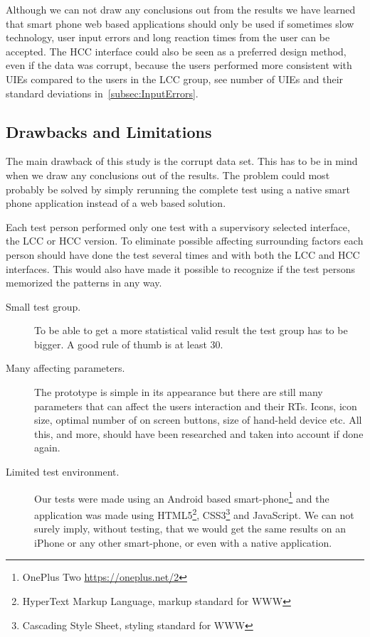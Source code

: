 \documentclass[runningheads,a4paper]{llncs}
\begin{document}
Although we can not draw any conclusions out from the results we have learned that smart phone web based applications should only be used if sometimes slow technology, user input errors and long reaction times from the user can be accepted. The HCC interface could also be seen as a preferred design method, even if the data was corrupt, because the users performed more consistent with UIEs compared to the users in the LCC group, see number of UIEs and their standard deviations in~\ref{subsec:InputErrors}.

\subsection{Drawbacks and Limitations}\label{subsec:drawbacks}
The main drawback of this study is the corrupt data set. This has to be in mind when we draw any conclusions out of the results. The problem could most probably be solved by simply rerunning the complete test using a native smart phone application instead of a web based solution.

Each test person performed only one test with a supervisory selected interface, the LCC or HCC version. To eliminate possible affecting surrounding factors each person should have done the test several times and with both the LCC and HCC interfaces. This would also have made it possible to recognize if the test persons memorized the patterns in any way.

\begin{description}
	\item[Small test group.] To be able to get a more statistical valid result the test group has to be bigger. A good rule of thumb is at least 30.
	\item[Many affecting parameters.] The prototype is simple in its appearance but there are still many parameters that can affect the users interaction and their RTs. Icons, icon size, optimal number of on screen buttons, size of hand-held device etc. All this, and more, should have been researched and taken into account if done again. 
	\item[Limited test environment.] Our tests were made using an Android based smart-phone\footnote{OnePlus Two \url{https://oneplus.net/2}} and the application was made using HTML5\footnote{HyperText Markup Language, markup standard for WWW}, CSS3\footnote{Cascading Style Sheet, styling standard for WWW} and JavaScript. We can not surely imply, without testing, that we would get the same results on an iPhone or any other smart-phone, or even with a native application.
\end{description}
\end{document}
